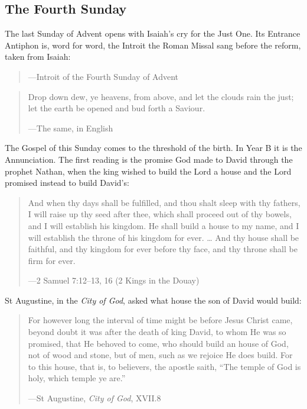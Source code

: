 \subsection{The Fourth Sunday}\label{sec:fourth-sunday}

The last Sunday of Advent opens with Isaiah's cry for the Just One. Its Entrance
Antiphon is, word for word, the Introit the Roman Missal sang before the reform,
taken from Isaiah:

\begin{quote}
\par
{\smallskip\noindent\small ---Introit of the Fourth Sunday of Advent\par}
\end{quote}

\begin{quote}
Drop down dew, ye heavens, from above, and let the clouds rain the just; let the
earth be opened and bud forth a Saviour.\par
{\smallskip\noindent\small ---The same, in English\par}
\end{quote}

\noindent The Gospel of this Sunday comes to the threshold of the birth. In Year
B it is the Annunciation. The first reading is the promise God
made to David through the prophet Nathan, when the king wished to build the Lord
a house and the Lord promised instead to build David's:

\begin{quote}
And when thy days shall be fulfilled, and thou shalt sleep with thy fathers, I
will raise up thy seed after thee, which shall proceed out of thy bowels, and I
will establish his kingdom. He shall build a house to my name, and I will
establish the throne of his kingdom for ever. \ldots{} And thy house shall be
faithful, and thy kingdom for ever before thy face, and thy throne shall be firm
for ever.\par
{\smallskip\noindent\small ---2 Samuel 7:12--13, 16 (2 Kings in the Douay)\par}
\end{quote}

\noindent St Augustine, in the \emph{City of God}, asked what house the son of
David would build:

\begin{quote}
For however long the interval of time might be before Jesus Christ came, beyond
doubt it was after the death of king David, to whom He was so promised, that He
behoved to come, who should build an house of God, not of wood and stone, but of
men, such as we rejoice He does build. For to this house, that is, to believers,
the apostle saith, ``The temple of God is holy, which temple ye are.''\par
{\smallskip\noindent\small ---St Augustine, \emph{City of God}, XVII.8\par}
\end{quote}

